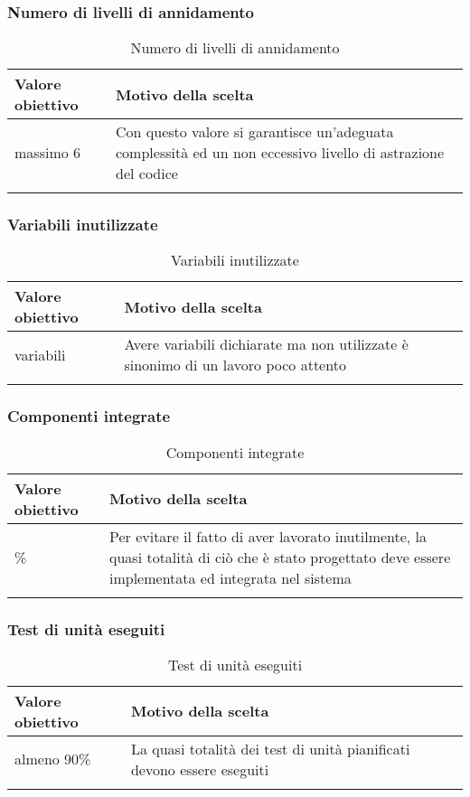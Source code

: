\documentclass[../PianoDiQualifica_v4.0.0.tex]{subfiles}
\begin{document}
		\subsubsection{Numero di livelli di annidamento}
			\begin{longtable}[c] { >{\centering\arraybackslash}p{4cm} p{7cm} }
				\toprule
				\centerline{\textbf{Valore obiettivo}} & \centerline{\textbf{Motivo della scelta}} \\
				\midrule
					massimo 6 &	Con questo valore si garantisce un'adeguata complessità ed un non eccessivo livello di astrazione del codice \\
				\bottomrule
				\caption{Numero di livelli di annidamento}
			\end{longtable}

		\subsubsection{Variabili inutilizzate}
			\begin{longtable}[c] { >{\centering\arraybackslash}p{4cm} p{7cm} }
				\toprule
				\centerline{\textbf{Valore obiettivo}} & \centerline{\textbf{Motivo della scelta}} \\
				\midrule
					0 variabili &	Avere variabili dichiarate ma non utilizzate è sinonimo di un lavoro poco attento \\
				\bottomrule
				\caption{Variabili inutilizzate}
			\end{longtable}

		\subsubsection{Componenti integrate}
			\begin{longtable}[c] { >{\centering\arraybackslash}p{4cm} p{7cm} }
				\toprule
				\centerline{\textbf{Valore obiettivo}} & \centerline{\textbf{Motivo della scelta}} \\
				\midrule
					90\% &	Per evitare il fatto di aver lavorato inutilmente, la quasi totalità di ciò che è stato progettato deve essere implementata ed integrata nel sistema\\
				\bottomrule
				\caption{Componenti integrate}
			\end{longtable}

		\subsubsection{Test di unità eseguiti}
			\begin{longtable}[c] { >{\centering\arraybackslash}p{4cm} p{7cm} }
				\toprule
				\centerline{\textbf{Valore obiettivo}} & \centerline{\textbf{Motivo della scelta}} \\
				\midrule
					almeno 90\% &	La quasi totalità dei test di unità pianificati devono essere eseguiti \\
				\bottomrule
				\caption{Test di unità eseguiti}
			\end{longtable}
\end{document}
